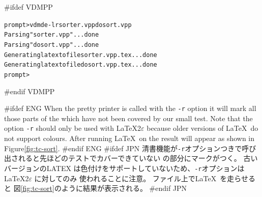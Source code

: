 \documentclass[\pformat,12pt]{article}
\newcommand{\vdmde}{vdmde}
\newcommand{\vdmde}{vppde}
\begin{document}
#ifdef VDMPP
\begin{alltt}
prompt> \vdmde -lr sorter.vpp dosort.vpp 
Parsing "sorter.vpp" ... done
Parsing "dosort.vpp" ... done
Generating latex to file sorter.vpp.tex ... done
Generating latex to file dosort.vpp.tex ... done
prompt>
\end{alltt}
#endif VDMPP

#ifdef ENG
When the pretty printer is called with the {\tt -r} option it will
mark all those parts of the  which have not been covered by our small
test. Note that the option {\tt -r} should only be used with
\LaTeX2$\varepsilon$ because older versions of \LaTeX\ do not
support colours. After running \LaTeX\ on
the result will appear as shown in Figure\ref{fig:tc-sort}.
#endif ENG
#ifdef JPN
清書機能が{\tt -r}オプションつきで呼び出されると先ほどのテストでカバーできていない
 の部分にマークがつく。
古いバージョンのLATEX は色付けをサポートしていないため、{\tt -r}オプションは\LaTeX2$\varepsilon$ に対してのみ
使われることに注意。
ファイル上で\LaTeX\ を走らせると
図\ref{fig:tc-sort}のように結果が表示される。
#endif JPN
\end{document}

